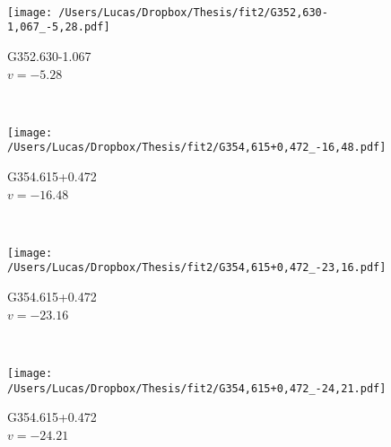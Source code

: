 \begin{figure*}[t]
\begin{subfigure}[t]{0.3\textwidth}
	\end{subfigure}
	~
	\begin{subfigure}[t]{0.3\textwidth}
		\texttt{[image: /Users/Lucas/Dropbox/Thesis/fit2/G352,630-1,067\_-5,28.pdf]}
		\caption[]{G352.630-1.067\\$v=-5.28$\,\kms}
	\end{subfigure}
	~
	\begin{subfigure}[t]{0.3\textwidth}
		\texttt{[image: /Users/Lucas/Dropbox/Thesis/fit2/G354,615+0,472\_-16,48.pdf]}
		\caption[]{G354.615+0.472\\$v=-16.48$\,\kms}
	\end{subfigure}
	~
	\begin{subfigure}[t]{0.3\textwidth}
		\texttt{[image: /Users/Lucas/Dropbox/Thesis/fit2/G354,615+0,472\_-23,16.pdf]}
		\caption[]{G354.615+0.472\\$v=-23.16$\,\kms}
	\end{subfigure}
	~
	\begin{subfigure}[t]{0.3\textwidth}
		\texttt{[image: /Users/Lucas/Dropbox/Thesis/fit2/G354,615+0,472\_-24,21.pdf]}
		\caption[]{G354.615+0.472\\$v=-24.21$\,\kms}
	\end{subfigure}
	~
\end{figure*}
\clearpage
